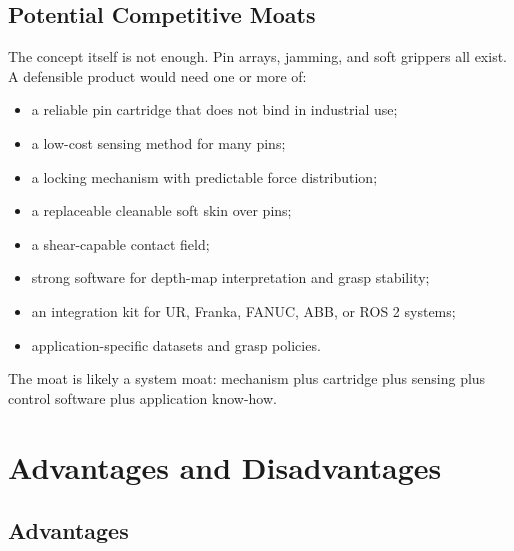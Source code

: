 \documentclass[11pt]{article}
\begin{document}
\subsection{Potential Competitive Moats}

The concept itself is not enough. Pin arrays, jamming, and soft grippers all exist. A defensible product would need one or more of:

\begin{itemize}[leftmargin=*]
  \item a reliable pin cartridge that does not bind in industrial use;
  \item a low-cost sensing method for many pins;
  \item a locking mechanism with predictable force distribution;
  \item a replaceable cleanable soft skin over pins;
  \item a shear-capable contact field;
  \item strong software for depth-map interpretation and grasp stability;
  \item an integration kit for UR, Franka, FANUC, ABB, or ROS 2 systems;
  \item application-specific datasets and grasp policies.
\end{itemize}

The moat is likely a system moat: mechanism plus cartridge plus sensing plus control software plus application know-how.

\section{Advantages and Disadvantages}

\subsection{Advantages}
\end{document}
